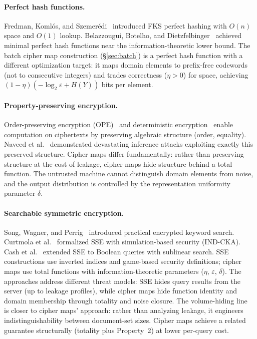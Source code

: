 \documentclass[11pt]{article}
\theoremstyle{definition}
\theoremstyle{plain}
\theoremstyle{remark}
\begin{document}
\paragraph{Perfect hash functions.}
Fredman, Koml\'{o}s, and Szemer\'{e}di~\cite{fredman1984storing} introduced
FKS perfect hashing with $O(n)$ space and $O(1)$ lookup.
Belazzougui, Botelho, and Dietzfelbinger~\cite{belazzougui2009hash} achieved
minimal perfect hash functions near the information-theoretic lower bound.
The batch cipher map construction (\S\ref{sec:batch}) is a perfect hash
function with a different optimization target: it maps domain elements to
prefix-free codewords (not to consecutive integers) and trades correctness
($\eta > 0$) for space, achieving $(1-\eta)(-\log_2\varepsilon + H(Y))$
bits per element.

\paragraph{Property-preserving encryption.}
Order-preserving encryption (OPE)~\cite{agrawal2004order,boldyreva2009order}
and deterministic encryption~\cite{bellare2007deterministic} enable
computation on ciphertexts by preserving algebraic structure (order,
equality).  Naveed et al.~\cite{naveed2015inference} demonstrated devastating inference
attacks exploiting exactly this preserved structure.  Cipher maps differ
fundamentally: rather than preserving structure at the cost of leakage,
cipher maps hide structure behind a total function.  The untrusted machine
cannot distinguish domain elements from noise, and the output distribution
is controlled by the representation uniformity parameter $\delta$.

\paragraph{Searchable symmetric encryption.}
Song, Wagner, and Perrig~\cite{song2000practical} introduced practical
encrypted keyword search.  Curtmola et al.~\cite{curtmola2006searchable}
formalized SSE with simulation-based security (IND-CKA).  Cash et
al.~\cite{cash2013highly} extended SSE to Boolean queries with sublinear
search.  SSE constructions use inverted indices and game-based security
definitions; cipher maps use total functions with information-theoretic
parameters ($\eta$, $\varepsilon$, $\delta$).  The approaches address
different threat models: SSE hides query results from the server (up to
leakage profiles), while cipher maps hide function identity and domain
membership through totality and noise closure.  The volume-hiding
line~\cite{kamara2019computationally} is closer to cipher maps' approach:
rather than analyzing leakage, it engineers indistinguishability between
document-set sizes.  Cipher maps achieve a related guarantee structurally
(totality plus Property~2) at lower per-query cost.
\end{document}

